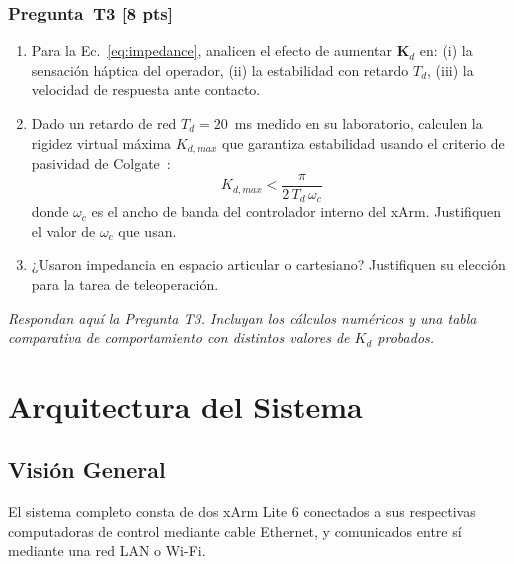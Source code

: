 \documentclass[journal,10pt,twoside]{IEEEtran}
\newcommand{\pts}[1]{\textcolor{tec_red}{\textbf{[#1 pts]}}}
\newcommand{\TODO}[1]{\begin{todobox}[Respuesta del equipo]
  \textit{#1}
\end{todobox}}
\begin{document}
\subsubsection*{Pregunta~T3 \pts{8}}
\begin{enumerate}[label=(\alph*)]
  \item Para la Ec.~\eqref{eq:impedance}, analicen el efecto de
        aumentar $\bm{K}_d$ en: (i) la sensación háptica del operador,
        (ii) la estabilidad con retardo $T_d$, (iii) la velocidad
        de respuesta ante contacto.
  \item Dado un retardo de red $T_d = 20$~ms medido en su laboratorio,
        calculen la rigidez virtual máxima $K_{d,max}$ que garantiza
        estabilidad usando el criterio de pasividad de Colgate~\cite{colgate1993}:
        \[
          K_{d,max} < \frac{\pi}{2\,T_d\,\omega_c}
        \]
        donde $\omega_c$ es el ancho de banda del controlador interno
        del xArm. Justifiquen el valor de $\omega_c$ que usan.
  \item ¿Usaron impedancia en espacio articular o cartesiano?
        Justifiquen su elección para la tarea de teleoperación.
\end{enumerate}
\TODO{Respondan aquí la Pregunta T3. Incluyan los cálculos numéricos
y una tabla comparativa de comportamiento con distintos valores de
$K_d$ probados.}

\section{Arquitectura del Sistema}
\label{sec:architecture}

\subsection{Visión General}

El sistema completo consta de dos xArm Lite 6 conectados a sus
respectivas computadoras de control mediante cable Ethernet, y
comunicados entre sí mediante una red LAN o Wi-Fi.
\end{document}

